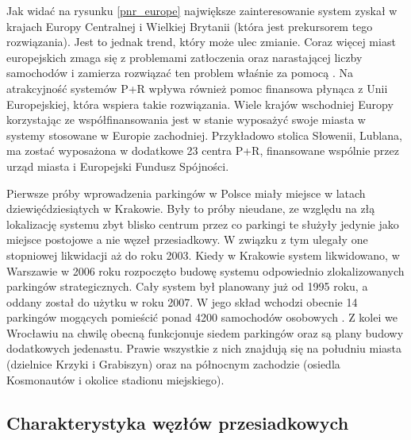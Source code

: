 \documentclass[twoside,12pt]{article}
\begin{document}
	Jak widać na rysunku \ref{pnr_europe} największe zainteresowanie system \pnr{} zyskał w krajach Europy Centralnej i Wielkiej Brytanii (która jest prekursorem tego rozwiązania). Jest to jednak trend, który może ulec zmianie. Coraz więcej miast europejskich zmaga się z problemami zatłoczenia oraz narastającej liczby samochodów i zamierza rozwiązać ten problem właśnie za pomocą \pnr{}. Na atrakcyjność systemów P+R wpływa również pomoc finansowa płynąca z Unii Europejskiej, która wspiera takie rozwiązania. Wiele krajów wschodniej Europy korzystając ze współfinansowania jest w stanie wyposażyć swoje miasta w systemy stosowane w Europie zachodniej. Przykładowo stolica Słowenii, Lublana, ma zostać wyposażona w dodatkowe 23 centra P+R, finansowane wspólnie przez urząd miasta i Europejski Fundusz Spójności. 
	
	
	Pierwsze próby wprowadzenia parkingów \pnr{} w Polsce miały miejsce w latach dziewięćdziesiątych w Krakowie. Były to próby nieudane, ze względu na złą lokalizację systemu zbyt blisko centrum przez co parkingi te służyły jedynie jako miejsce postojowe a nie węzeł przesiadkowy. W związku z tym ulegały one stopniowej likwidacji aż do roku 2003. Kiedy w Krakowie system likwidowano, w Warszawie w 2006 roku rozpoczęto budowę systemu odpowiednio zlokalizowanych parkingów strategicznych. Cały system był planowany już od 1995 roku, a oddany został do użytku w roku 2007. W jego skład wchodzi obecnie 14 parkingów mogących pomieścić ponad 4200 samochodów osobowych \cite{rybczynska}. Z kolei we Wrocławiu na chwilę obecną funkcjonuje siedem parkingów \pnr{} oraz są plany budowy dodatkowych jedenastu. Prawie wszystkie z nich znajdują się na południu miasta (dzielnice Krzyki i Grabiszyn) oraz na północnym zachodzie (osiedla Kosmonautów i okolice stadionu miejskiego).
	
	\clearpage
	\subsection{Charakterystyka węzłów przesiadkowych}
	
\end{document}
